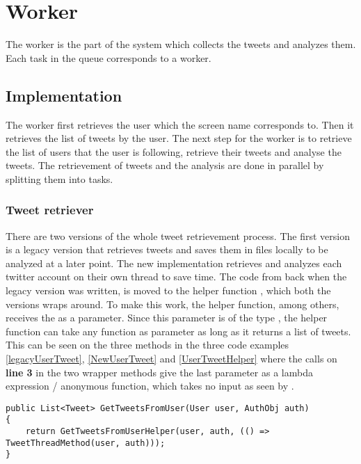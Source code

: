 \chapter{Worker}\label{workerLabel}
The worker is the part of the system which collects the tweets and analyzes
them. Each task in the queue corresponds to a worker. 

\section{Implementation}
The worker first retrieves the user which the screen name corresponds to. Then
it retrieves the list of tweets by the user. The next step for the
worker is to retrieve the list of users that the user is following, retrieve
their tweets and analyse the tweets. The retrievement of tweets and the
analysis are done in parallel by splitting them into tasks.

\subsection{Tweet retriever}
There are two versions of the whole tweet retrievement process. The first
version is a legacy version that retrieves tweets and saves them in files
locally to be analyzed at a later point. The new implementation retrieves and
analyzes each twitter account on their own thread to save time. The code from
back when the legacy version was written, is moved to the helper function
, which both the versions wraps around. To make this
work, the helper function, among others, receives the  as
a parameter. Since this parameter is of the type , the
helper function can take any function as parameter as long as it returns a list
of tweets.
This can be seen on the three methods in the three code examples
\autoref{legacyUserTweet}, \autoref{NewUserTweet} and
\autoref{UserTweetHelper} where the calls on \textbf{line 3} in the two
wrapper methods give the last parameter as a lambda expression / anonymous
function, which takes no input as seen by \textc{() =>}.\\

\begin{minipage}[H]{\linewidth}
\begin{lstlisting}[caption = Legacy method call , label = legacyUserTweet ] 
public List<Tweet> GetTweetsFromUser(User user, AuthObj auth)
{	
    return GetTweetsFromUserHelper(user, auth, (() => TweetThreadMethod(user, auth)));
}
\end{lstlisting}
\end{minipage}


